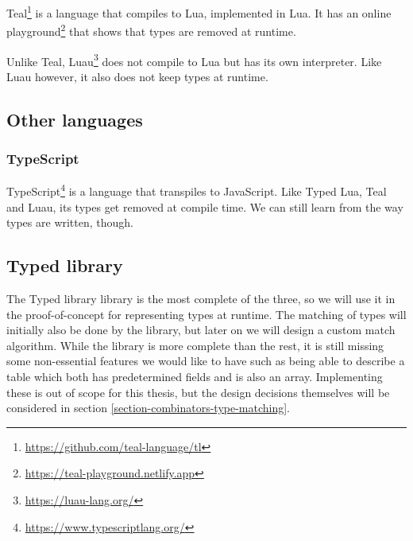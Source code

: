 Teal\footnote{\url{https://github.com/teal-language/tl}} is a language that compiles to Lua, implemented in Lua. It has an online playground\footnote{\url{https://teal-playground.netlify.app}} that shows that types are removed at runtime.

Unlike Teal, Luau\footnote{\url{https://luau-lang.org/}} does not compile to Lua but has its own interpreter. Like Luau however, it also does not keep types at runtime.

\subsection{Other languages}
\subsubsection{TypeScript}
TypeScript\footnote{\url{https://www.typescriptlang.org/}} is a language that transpiles to JavaScript. Like Typed Lua, Teal and Luau, its types get removed at compile time. We can still learn from the way types are written, though.

\subsection{Typed library}
The Typed library library is the most complete of the three, so we will use it in the proof-of-concept for representing types at runtime. The matching of types will initially also be done by the library, but later on we will design a custom match algorithm. While the library is more complete than the rest, it is still missing some non-essential features we would like to have such as being able to describe a table which both has predetermined fields and is also an array. Implementing these is out of scope for this thesis, but the design decisions themselves will be considered in section \ref{section-combinators-type-matching}.
